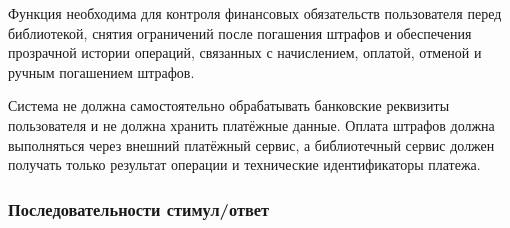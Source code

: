 \documentclass[12pt,a4paper]{article}
\begin{document}
	Функция необходима для контроля финансовых обязательств пользователя перед
	библиотекой, снятия ограничений после погашения штрафов и обеспечения
	прозрачной истории операций, связанных с начислением, оплатой, отменой
	и ручным погашением штрафов.
	
	Система не должна самостоятельно обрабатывать банковские реквизиты пользователя
	и не должна хранить платёжные данные. Оплата штрафов должна выполняться через
	внешний платёжный сервис, а библиотечный сервис должен получать только результат
	операции и технические идентификаторы платежа.
	
	\subsubsection{Последовательности стимул/ответ}
	
\end{document}
